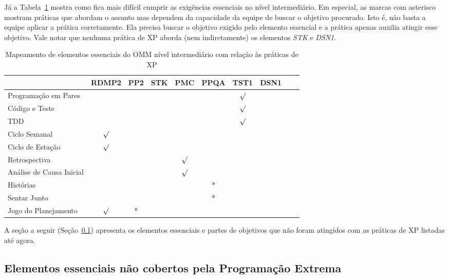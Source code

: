 Já a Tabela~\ref{tab:omm-intermediary-by-xp} mostra como fica mais
difícil cumprir as exigências essenciais no nível intermediário. Em
especial, as marcas com asterisco mostram práticas que abordam o
assunto mas dependem da capacidade da equipe de buscar o objetivo
procurado. Isto é, não basta a equipe aplicar a prática
corretamente. Ela precisa buscar o objetivo exigido pelo elemento
essencial e a prática apenas auxilia atingir esse objetivo. Vale notar
que nenhuma prática de XP aborda (nem indiretamente) os elementos
\textit{STK} e \textit{DSN1}.

\begin{table}
  \centering
  \begin{tabular}{|p{6cm}|c|c|c|c|c|c|c|c|c|}
    \hline
    & RDMP2 & PP2 & STK & PMC & PPQA & TST1 & DSN1\\
    \hline
    Programação em Pares & & & & & & $\surd$ & \\
    \hline
    Código e Teste & & & & & & $\surd$ & \\
    \hline
    TDD & & & & & & $\surd$ & \\
    \hline
    Ciclo Semanal & $\surd$ & & & & & & \\
    \hline
    Ciclo de Estação & $\surd$ & & & & & & \\
    \hline
    Retrospectiva & & & & $\surd$ & & & \\
    \hline
    Análise de Causa Inicial & & & & $\surd$ & & & \\
    \hline
    Histórias & & & & & * & & \\
    \hline
    Sentar Junto & & & & & * & & \\
    \hline
    Jogo do Planejamento & $\surd$ & * & & & & & \\
    \hline
  \end{tabular}
  \caption{Mapeamento de elementos essenciais do OMM nível
    intermediário com relação às práticas de XP}
  \label{tab:omm-intermediary-by-xp}
\end{table}

A seção a seguir (Seção~\ref{sec:xp-omm}) apresenta os elementos
essenciais e partes de objetivos que não foram atingidos com as
práticas de XP listadas até agora.

\subsection{Elementos essenciais não cobertos pela Programação
  Extrema}
\label{sec:xp-omm}

